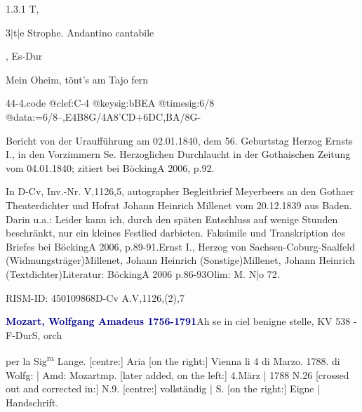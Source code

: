 \documentclass[a4paper, twocolumn, 11pt]{book}
\begin{document}
\newline %
\par 1.3.1  T, \begin{itshape}3|t|e Strophe. Andantino cantabile\end{itshape}, Es-Dur\newline \begin{footnotesize} Mein Oheim, tönt’s am Tajo fern \end{footnotesize}  
\begin{filecontents*}{44-4.code}
@clef:C-4
@keysig:bBEA
@timesig:6/8
@data:=6/8--,E4B8G/4A8'CD+{6DC},{BA}/8G-
\end{filecontents*}
\newline %
\par Bericht von der Uraufführung am 02.01.1840, dem 56. Geburtstag Herzog Ernsts I., in den {\textquotedbl}Vorzimmern Se. Herzoglichen Durchlaucht{\textquotedbl} in der Gothaischen Zeitung vom 04.01.1840; zitiert bei BöckingA 2006, p.92.
\par In D-Cv, Inv.-Nr. V,1126,5, autographer Begleitbrief Meyerbeers an den Gothaer Theaterdichter und Hofrat Johann Heinrich Millenet vom 20.12.1839 aus Baden. Darin u.a.: {\textquotedbl}Leider kann ich, durch den späten Entschluss auf wenige Stunden beschränkt, nur ein kleines Festlied darbieten.{\textquotedbl} Faksimile und Transkription des Briefes bei BöckingA 2006, p.89-91.\newline Ernst I., Herzog von Sachsen-Coburg-Saalfeld  (Widmungsträger)\newline Millenet, Johann Heinrich  (Sonstige)\newline Millenet, Johann Heinrich  (Textdichter)\newline Literatur: BöckingA 2006  p.86-93\newline Olim: M. N|o 72.
\par RISM-ID: 450109868\newline D-Cv  A.V,1126,(2),7
\par \vspace{16pt} \textcolor{darkblue}{\textbf{Mozart, Wolfgang Amadeus  1756-1791}}\hfillplus{[45]}\newline Ah se in ciel benigne stelle, KV 538 - F-Dur\newline S, orch
\par \begin{itshape} per la Sig\textsuperscript{r}\textsuperscript{a} Lange. [centre:] Aria [on the right:] Vienna li 4 di Marzo. 1788. di Wolfg: | Amd: Mozartmp. [later added, on the left:] 4.März | 1788 N.26 [crossed out and corrected in:] N.9. [centre:] vollständig | S. [on the right:]  Eigne | Handschrift.\end{itshape} 
\end{document}
